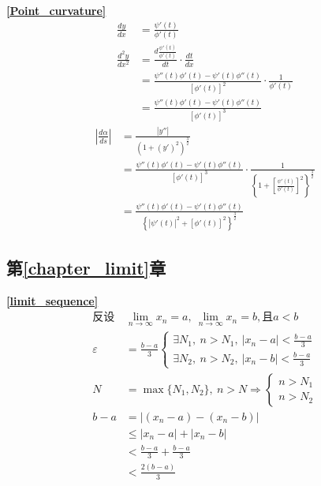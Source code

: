 \textbf{\large \ref{Point_curvature}}
\begin{align*}
    \frac{dy}{dx}&=\frac{\psi'(t)}{\phi'(t)}\\
    \frac{d^2y}{dx^2}&=\frac{d\frac{\psi'(t)}{\phi'(t)}}{dt}\cdot\frac{dt}{dx}\\
    &=\frac{\psi''(t)\phi'(t)-\psi'(t)\phi''(t)}{\left[\phi'(t)\right]^2}\cdot\frac{1}{\phi'(t)}\\
    &=\frac{\psi''(t)\phi'(t)-\psi'(t)\phi''(t)}{\left[\phi'(t)\right]^3}
\end{align*}
\begin{align*}
    \left|\frac{d\alpha}{ds}\right|&=\frac{\left|y''\right|}{\left(1+(y')^2\right)^{\frac{3}{2}}}\\
    &=\frac{\psi''(t)\phi'(t)-\psi'(t)\phi''(t)}{\left[\phi'(t)\right]^3}\cdot\frac{1}{\left\{1+\left[\frac{\psi'(t)}{\phi'(t)}\right]^2\right\}^{\frac{3}{2}}}\\
    &=\frac{\psi''(t)\phi'(t)-\psi'(t)\phi''(t)}{\left\{\left|\psi'(t)\right|^2+\left[\phi'(t)\right]^2\right\}^{\frac{3}{2}}}
\end{align*}

\subsection{\centering 第\ref{chapter_limit}章}
\textbf{\large \ref{limit_sequence}}
\begin{align*}
        \mbox{反设}&\lim\limits_{n \to \infty}x_n =a,\ \lim\limits_{n \to \infty}x_n =b,\mbox{且}a<b\\
        \varepsilon&=\frac{b-a}{3}\begin{cases}
            \exists N_1,\ n>N_1,\ \left|x_n-a\right|<\frac{b-a}{3}\\
            \exists N_2,\ n>N_2,\ \left|x_n-b\right|<\frac{b-a}{3}
        \end{cases}\\
        N&=\max\{N_1,N_2\},\ n>N\Rightarrow\begin{cases}
            n>N_1\\
            n>N_2
        \end{cases}\\
        b-a&=\left|(x_n-a)-(x_n-b)\right|\\
        &\leqslant \left|x_n-a\right|+\left|x_n-b\right|\\
        &<\frac{b-a}{3}+\frac{b-a}{3}\\
        &<\frac{2(b-a)}{3}
\end{align*}


